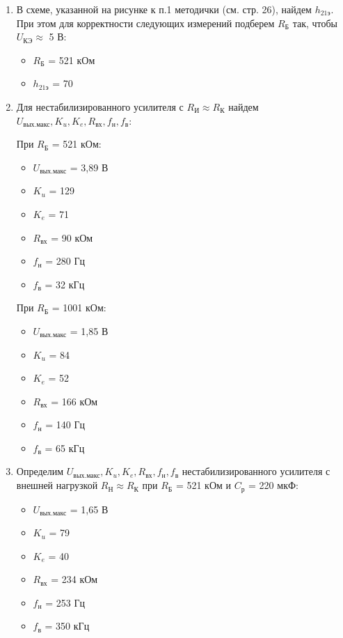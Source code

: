 \documentclass[a4paper,12pt]{report}
\begin{document}
\begin{enumerate}
\item В схеме, указанной на рисунке к п.1 методички (см. стр. 26), найдем $h_{21\text{э}}$. При этом для корректности следующих измерений подберем $R_{\text{Б}}$ так, чтобы $U_{\text{КЭ}}\approx$ 5 В:
    \begin{itemize}
        \item $R_{\text{Б}}$ = 521 кОм
        \item $h_{21\text{э}}$ = 70
    \end{itemize}

   \item Для нестабилизированного усилителя с $R_{\text{И}} \approx R_{\text{К}}$ найдем $U_{\text{вых.макс}}, K_{u}, K_{e}, R_{\text{вх}}, f_{\text{н}}, f_{\text{в}}$:

    При $R_{\text{Б}}$ = 521 кОм:
    \begin{itemize}
        \item $U_{\text{вых.макс}}$ = 3,89 В
        \item $K_{u}$ = 129
        \item $K_{e}$ = 71
        \item $R_{\text{вх}}$ = 90 кОм
        \item $f_{\text{н}}$ = 280 Гц
        \item $f_{\text{в}}$ = 32 кГц
    \end{itemize}

    При $R_{\text{Б}}$ = 1001 кОм:
    \begin{itemize}
        \item $U_{\text{вых.макс}}$ = 1,85 В
        \item $K_{u}$ = 84
        \item $K_{e}$ = 52
        \item $R_{\text{вх}}$ = 166 кОм
        \item $f_{\text{н}}$ = 140 Гц
        \item $f_{\text{в}}$ = 65 кГц
    \end{itemize}


    \item Определим $U_{\text{вых.макс}}, K_{u}, K_{e}, R_{\text{вх}}, f_{\text{н}}, f_{\text{в}}$ нестабилизированного усилителя с внешней нагрузкой $R_{\text{Н}} \approx R_{\text{К}}$ при $R_{\text{Б}}$ = 521 кОм и $C_{\text{р}}$ = 220 мкФ:
    \begin{itemize}
        \item $U_{\text{вых.макс}}$ = 1,65 В
        \item $K_{u}$ = 79
        \item $K_{e}$ = 40
        \item $R_{\text{вх}}$ = 234 кОм
        \item $f_{\text{н}}$ = 253 Гц
        \item $f_{\text{в}}$ = 350 кГц
    \end{itemize}
    
\end{enumerate}
\end{document}
